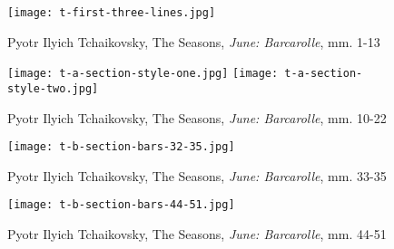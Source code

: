 \begin{figure}
  \centering
  \texttt{[image: t-first-three-lines.jpg]}
  \caption{Pyotr Ilyich Tchaikovsky, The Seasons, \textit{June: Barcarolle}, mm. 1-13}
  \label{fig:t-first-three-lines}
\end{figure}

\begin{figure}
  \centering
  \texttt{[image: t-a-section-style-one.jpg]}
  \texttt{[image: t-a-section-style-two.jpg]}
  \caption{Pyotr Ilyich Tchaikovsky, The Seasons, \textit{June: Barcarolle}, mm. 10-22}
  \label{fig:t-a-section-style-choices}
\end{figure}

\begin{figure}
  \centering
  \texttt{[image: t-b-section-bars-32-35.jpg]}
  \caption{Pyotr Ilyich Tchaikovsky, The Seasons, \textit{June: Barcarolle}, mm. 33-35}
  \label{fig:t-b-section-bars-32-35}
\end{figure}

\begin{figure}
  \centering
  \texttt{[image: t-b-section-bars-44-51.jpg]}
  \caption{Pyotr Ilyich Tchaikovsky, The Seasons, \textit{June: Barcarolle}, mm. 44-51}
  \label{fig:t-b-section-bars-44-51}
\end{figure}


